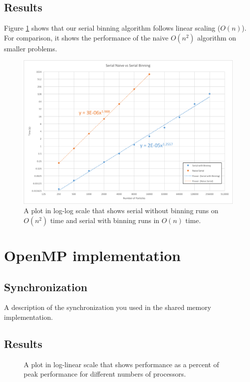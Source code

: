 \documentclass[12pt]{article}
\begin{document}
\subsection{Results}
Figure \ref{fig:serial-on} shows that our serial binning algorithm follows linear scaling ($O(n)$). For comparison, it shows the performance of the naive $O(n^2)$ algorithm on smaller problems.

\begin{figure}
 \includegraphics[width=\textwidth]{graphs/serial_binning_vs_naive.png}
  \caption{A plot in log-log scale that shows serial without binning runs on $O(n^2)$ time and serial with binning runs in $O(n)$ time.}
  \label{fig:serial-on}
\end{figure}

\section{OpenMP implementation}

\subsection{Synchronization}
A description of the synchronization you used in the shared memory implementation.

\subsection{Results}

\begin{figure}
  \caption{A plot in log-linear scale that shows performance as a percent of peak performance for different numbers of processors.}
  \label{fig:serial-peak}
\end{figure}
\end{document}
